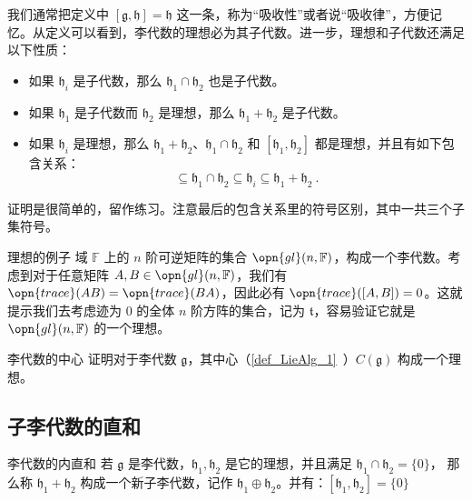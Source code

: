 我们通常把定义中 $[\mathfrak{g}, \mathfrak{h}]=\mathfrak{h}$ 这一条，称为“吸收性”或者说“吸收律”，方便记忆。从定义可以看到，李代数的理想必为其子代数。进一步，理想和子代数还满足以下性质：

\begin{itemize}
\item 如果 $\mathfrak{h}_i$ 是子代数，那么 $\mathfrak{h}_1\cap\mathfrak{h}_2$ 也是子代数。
\item 如果 $\mathfrak{h}_1$ 是子代数而 $\mathfrak{h}_2$ 是理想，那么 $\mathfrak{h}_1+\mathfrak{h}_2$ 是子代数。
\item 如果 $\mathfrak{h}_i$ 是理想，那么 $\mathfrak{h}_1+\mathfrak{h}_2$、$\mathfrak{h}_1\cap\mathfrak{h}_2$ 和 $[\mathfrak{h}_1, \mathfrak{h}_2]$ 都是理想，并且有如下包含关系：\begin{equation}
[\mathfrak{h}_1, \mathfrak{h}_2]\subseteq\mathfrak{h}_1\cap\mathfrak{h}_2\subseteq\mathfrak{h}_i\subseteq\mathfrak{h}_1+\mathfrak{h}_2~.
\end{equation}

\end{itemize}

证明是很简单的，留作练习。注意最后的包含关系里的符号区别，其中一共三个子集符号。

\begin{example}{理想的例子}%
域 $\mathbb{F}$ 上的 $n$ 阶可逆矩阵的集合 $\opn{gl}(n, \mathbb{F})$，构成一个李代数。考虑到对于任意矩阵 $A, B\in\opn{gl}(n, \mathbb{F})$，我们有 $\opn{trace}(AB)=\opn{trace}(BA)$，因此必有 $\opn{trace}([A, B])=0$。这就提示我们去考虑迹为 $0$ 的全体 $n$ 阶方阵的集合，记为 $\mathfrak{t}$，容易验证它就是 $\opn{gl}(n, \mathbb{F})$ 的一个理想。
\end{example}

\begin{exercise}{李代数的中心}
证明对于李代数 $\mathfrak{g}$，其中心（\autoref{def_LieAlg_1}~）$C(\mathfrak{g})$ 构成一个理想。
\end{exercise}


\subsection{子李代数的直和}

\begin{definition}{李代数的内直和}
若 $\mathfrak{g}$ 是李代数，$\mathfrak{h}_1, \mathfrak{h}_2$ 是它的理想，并且满足 $\mathfrak{h}_1 \cap \mathfrak{h}_2 = \{0\}$， 那么称 $\mathfrak{h}_1 + \mathfrak{h}_2$ 构成一个新子李代数，记作 $\mathfrak{h}_1 \oplus \mathfrak{h}_2$。并有：$[\mathfrak{h}_1, \mathfrak{h}_2] = \{0\}$
\end{definition}

